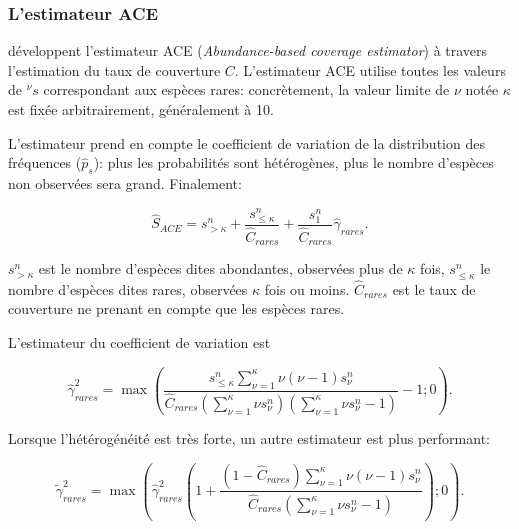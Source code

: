 \documentclass[
  11pt,
  french,
  a4paper,
  extrafontsizes,onecolumn,openright
  ]{memoir}
\newlength{\rf}
\begin{document}
\hypertarget{lestimateur-ace}{%
\subsubsection{L'estimateur ACE}\label{lestimateur-ace}}

\textcite{Chao1992} développent l'estimateur ACE (\emph{Abundance-based coverage estimator}) à travers l'estimation du taux de couverture \(C\).
L'estimateur ACE utilise toutes les valeurs de \(^{\nu }s\) correspondant aux espèces rares: concrètement, la valeur limite de \(\nu\) notée \(\kappa\) est fixée arbitrairement, généralement à 10.

L'estimateur prend en compte le coefficient de variation de la distribution des fréquences (\({\hat{p}}_s\)): plus les probabilités sont hétérogènes, plus le nombre d'espèces non observées sera grand.
Finalement:

\begin{equation}
  \label{eq:ACE}
  \hat{S}_{\mathit{ACE}} = s^{n}_{>\kappa} + \frac{s^{n}_{\le\kappa}}{\hat{C}_\mathit{rares}}+\frac{s^{n}_{1}}{{\hat{C}}_\mathit{rares}}{\hat{\gamma}}_\mathit{rares}.
\end{equation}

\(s^{n}_{>\kappa}\) est le nombre d'espèces dites abondantes, observées plus de \(\kappa\) fois, \(s^{n}_{\le\kappa}\) le nombre d'espèces dites rares, observées \(\kappa\) fois ou moins.
\(\hat{C}_\mathit{rares}\) est le taux de couverture ne prenant en compte que les espèces rares.

L'estimateur du coefficient de variation est

\begin{equation}
  \label{eq:ACEcv}
  \hat{\gamma}^{2}_\mathit{rares} = \max\left(\frac{s^{n}_{\le\kappa}\sum^{\kappa}_{\nu=1}{\nu\left(\nu-1\right){s^{n}_{\nu}}}}{\hat{C}_\mathit{rares}\left(\sum^{\kappa}_{\nu=1}{\nu s^{n}_{\nu}}\right)\left(\sum^{\kappa}_{\nu=1}{\nu s^{n}_{\nu}}-1\right)}-1; 0\right).
\end{equation}

Lorsque l'hétérogénéité est très forte, un autre estimateur est plus performant:

\begin{equation}
  \label{eq:ACEcv2}
  \tilde{\gamma}^{2}_\mathit{rares} = \max\left({\widehat{\gamma}}^2_\mathit{rares}\left(1+\frac{\left(1-{\hat{C}}_\mathit{rares}\right)\sum^{\kappa}_{\nu=1}{\nu\left(\nu -1\right){s^{n}_{\nu}}}}{{\hat{C}}_\mathit{rares}\left(\sum^{\kappa}_{\nu =1}{\nu s^{n}_{\nu}-1}\right)}\right); 0 \right).
\end{equation}
\end{document}
